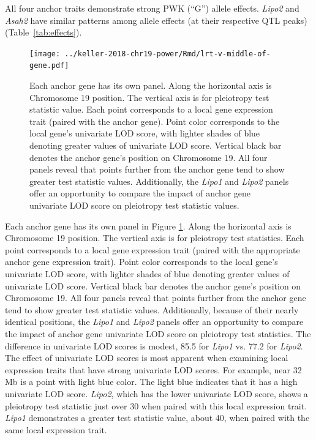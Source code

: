 \documentclass[oneside]{book}\usepackage[]{graphicx}\usepackage[]{color}
\begin{document}
All four anchor traits demonstrate strong PWK (``G'') allele effects. 
\emph{Lipo2} and \emph{Asah2} have similar patterns among allele effects (at their respective QTL peaks) (Table~\ref{tab:effects}).



\begin{figure}
    \centering
    \texttt{[image: ../keller-2018-chr19-power/Rmd/lrt-v-middle-of-gene.pdf]}
    \caption[Pleiotropy LRT vs. chromosomal position plots reveal that higher values of pleiotropy LRT tend to correspond to greater interlocus distance and greater univariate LOD score.]{Each anchor gene has its own panel. Along the horizontal axis is Chromosome 19 position. The vertical axis is for pleiotropy test statistic value. Each point corresponds to a local gene expression trait (paired with the anchor gene). Point color corresponds to the local gene's univariate LOD score, with lighter shades of blue denoting greater values of univariate LOD score. Vertical black bar denotes the anchor gene's position on Chromosome 19. All four panels reveal that points further from the anchor gene tend to show greater test statistic values. Additionally, the \emph{Lipo1} and \emph{Lipo2} panels offer an opportunity to compare the impact of anchor gene univariate LOD score on pleiotropy test statistic values.}
    \label{fig:middle}
\end{figure}

Each anchor gene has its own panel in Figure \ref{fig:middle}. 
Along the horizontal axis is Chromosome 19 position. 
The vertical axis is for pleiotropy test statistics. 
Each point corresponds to a local gene expression trait (paired with the appropriate anchor gene expression trait). 
Point color corresponds to the local gene's univariate LOD score, with lighter shades of blue denoting greater values of univariate LOD score. 
Vertical black bar denotes the anchor gene's position on Chromosome 19. 
All four panels reveal that points further from the anchor gene tend to show greater test statistic values. 
Additionally, because of their nearly identical positions, the \emph{Lipo1} and \emph{Lipo2} panels offer an opportunity to compare the impact 
of anchor gene univariate LOD score on pleiotropy test statistics.
The difference in univariate LOD scores is modest, 85.5 for \emph{Lipo1} vs. 77.2 for \emph{Lipo2}. The effect of univariate LOD scores is most apparent when examining local expression traits that have strong univariate LOD scores. 
For example, near 32 Mb is a point with light blue color. The light blue indicates that it has a high univariate LOD score. 
\emph{Lipo2}, which has the lower univariate LOD score, shows a pleiotropy test statistic just over 30 when paired with this local expression trait. 
\emph{Lipo1} demonstrates a greater test statistic value, about 40, when paired with the same local expression trait.
\end{document}
